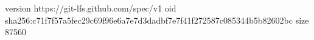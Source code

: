 version https://git-lfs.github.com/spec/v1
oid sha256:c71f7f57a5fec29c69f96e6a7e7d3dadbf7e7f41f272587c085344b5b82602bc
size 87560

